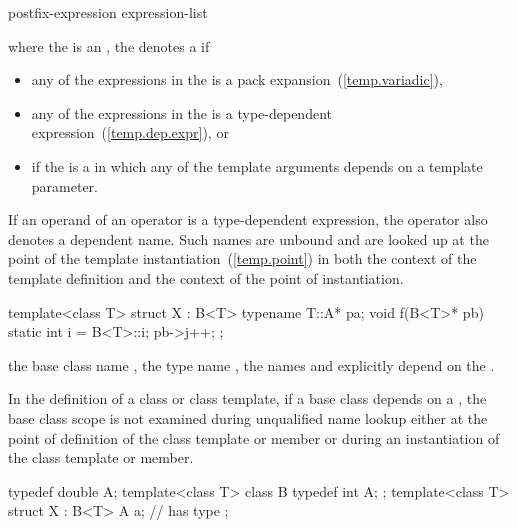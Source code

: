 \begin{ncbnftab}
postfix-expression \terminal{(} expression-list\opt \terminal{)}
\end{ncbnftab}

where the
is an
,
the
denotes a
%
if

\begin{itemize}
\item 
any of the expressions in the  is a pack
expansion~(\ref{temp.variadic}),

\item
any of the expressions in the
is a type-dependent expression~(\ref{temp.dep.expr}), or

\item
if the 
is a  in which any of the template arguments depends
on a template parameter.
\end{itemize}

If an operand of an operator is a type-dependent expression, the operator
also denotes a dependent name.
Such names are unbound and
are looked up at the point of the template instantiation~(\ref{temp.point}) in
both the context of the template definition and the
context of the point of instantiation.

\pnum
\enterexample
\begin{codeblock}
template<class T> struct X : B<T> {
  typename T::A* pa;
  void f(B<T>* pb) {
    static int i = B<T>::i;
    pb->j++;
  }
};
\end{codeblock}

the base class name
,
the type name
,
the names
and
explicitly depend on the
.
\exitexample

\pnum
In the definition of a class or class template, if a base class
depends on a
,
the base class scope is not examined during unqualified
name lookup either at the point of definition of the
class template or member or during an instantiation of
the class template or member.
\enterexample

\begin{codeblock}
typedef double A;
template<class T> class B {
  typedef int A;
};
template<class T> struct X : B<T> {
  A a;              //  has type 
};
\end{codeblock}


